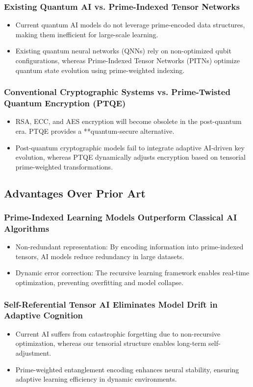 \documentclass{article}
\theoremstyle{plain}
\begin{document}
\subsubsection{Existing Quantum AI vs. Prime-Indexed Tensor Networks}
\begin{itemize}
    \item Current quantum AI models do not leverage prime-encoded data structures, making them inefficient for large-scale learning.
    \item Existing quantum neural networks (QNNs) rely on non-optimized qubit configurations, whereas Prime-Indexed Tensor Networks (PITNs) optimize quantum state evolution using prime-weighted indexing.
\end{itemize}

\subsubsection{Conventional Cryptographic Systems vs. Prime-Twisted Quantum Encryption (PTQE)}
\begin{itemize}
    \item RSA, ECC, and AES encryption will become obsolete in the post-quantum era. PTQE provides a **quantum-secure alternative.
    \item Post-quantum cryptographic models fail to integrate adaptive AI-driven key evolution, whereas PTQE dynamically adjusts encryption based on tensorial prime-weighted transformations.
\end{itemize}

\subsection{Advantages Over Prior Art}
\subsubsection{Prime-Indexed Learning Models Outperform Classical AI Algorithms}
\begin{itemize}
    \item Non-redundant representation: By encoding information into prime-indexed tensors, AI models reduce redundancy in large datasets.
    \item Dynamic error correction: The recursive learning framework enables real-time optimization, preventing overfitting and model collapse.
\end{itemize}

\subsubsection{Self-Referential Tensor AI Eliminates Model Drift in Adaptive Cognition}
\begin{itemize}
    \item Current AI suffers from catastrophic forgetting due to non-recursive optimization, whereas our tensorial structure enables long-term self-adjustment.
    \item Prime-weighted entanglement encoding enhances neural stability, ensuring adaptive learning efficiency in dynamic environments.
\end{itemize}
\end{document}
